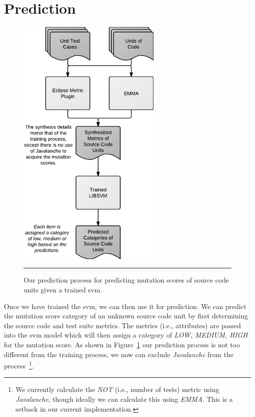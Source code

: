 \section{Prediction}
\label{sec:approach_prediction}
\begin{figure}[!tb]
  \centering
  \includegraphics[width=7cm]{figures/process_prediction.pdf}
  \caption{Our prediction process for predicting mutation scores of source code units given a trained \gls{svm}.}
  \label{fig:process_prediction}
  \vspace{2mm}
  \hrule
\end{figure}

Once we have trained the \gls{svm}, we can then use it for prediction. We can predict the mutation score category of an unknown source code unit by first determining the source code and test suite metrics. The metrics (i.e., attributes) are passed into the \gls{svm} model which will then assign a category of \textit{LOW, MEDIUM, HIGH} for the mutation score. As shown in Figure~\ref{fig:process_prediction} our prediction process is not too different from the training process, we now can exclude \emph{Javalanche} from the process~\footnote{We currently calculate the \emph{NOT} (i.e., number of tests) metric using \emph{Javalanche}, though ideally we can calculate this using \emph{EMMA}. This is a setback in our current implementation.}.


